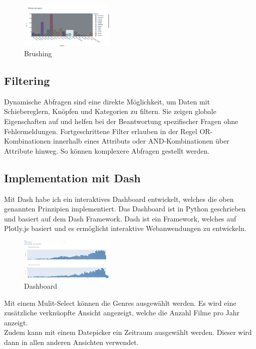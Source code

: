 \documentclass{article}
\begin{document}
\begin{figure}[!h]
\centering
\includegraphics[width=0.4\textwidth]{img/brushing.png}
\caption{\label{fig: LE2 Brushing} Brushing}
\end{figure}

\subsection{Filtering}
Dynamische Abfragen sind eine direkte Möglichkeit, um Daten mit Schiebereglern, Knöpfen und Kategorien zu filtern. 
Sie zeigen globale Eigenschaften auf und helfen bei der Beantwortung spezifischer Fragen ohne Fehlermeldungen. 
Fortgeschrittene Filter erlauben in der Regel OR-Kombinationen innerhalb eines Attributs oder AND-Kombinationen über Attribute hinweg. 
So können komplexere Abfragen gestellt werden.\cite{shneiderman_eyes_1996} \\

\subsection{Implementation mit Dash}

Mit Dash habe ich ein interaktives Dashboard entwickelt, welches die oben genannten Prinzipien implementiert. Das Dashboard ist in Python geschrieben und basiert auf dem Dash Framework. Dash ist ein Framework, welches auf Plotly.js basiert und es ermöglicht interaktive Webanwendungen zu entwickeln.\cite{noauthor_dash_nodate} \\

\begin{figure}[!h]
\centering
\includegraphics[width=0.4\textwidth]{img/dashboard_plotly.png}
\caption{\label{fig: LE2 Dashboard} Dashboard}
\end{figure}

Mit einem Mulit-Select können die Genres ausgewählt werden. Es wird eine zusätzliche verknüopfte Ansicht angezeigt, welche die Anzahl Filme pro Jahr anzeigt.\\
Zudem kann mit einem Datepicker ein Zeitraum ausgewählt werden. Dieser wird dann in allen anderen Ansichten verwendet.\\

\newpage


\printbibliography
\end{document}
